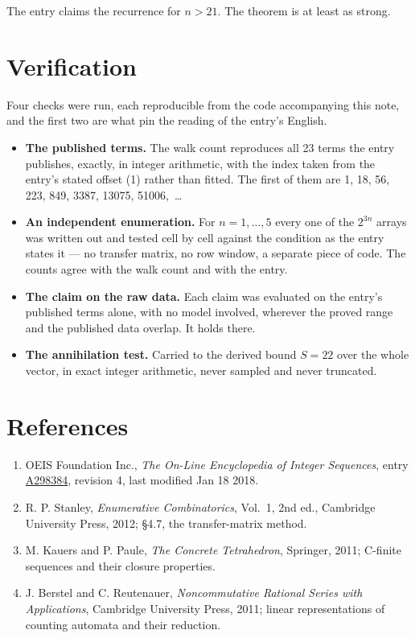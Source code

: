 \documentclass[11pt]{article}
\theoremstyle{definition}
\begin{document}
The entry claims the recurrence for $n > 21$. The theorem is at least as strong.

\section{Verification}

Four checks were run, each reproducible from the code accompanying this note, and the first two are what pin the reading of the entry's English.

\begin{itemize}

\item {\bfseries The published terms.} The walk count reproduces all 23 terms the entry publishes, exactly, in integer arithmetic, with the index taken from the entry's stated offset (1) rather than fitted. The first of them are 1, 18, 56, 223, 849, 3387, 13075, 51006,~\dots

\item {\bfseries An independent enumeration.} For $n = 1,\dots,5$ every one of the $2^{3n}$ arrays was written out and tested cell by cell against the condition as the entry states it --- no transfer matrix, no row window, a separate piece of code. The counts agree with the walk count and with the entry.

\item {\bfseries The claim on the raw data.} Each claim was evaluated on the entry's published terms alone, with no model involved, wherever the proved range and the published data overlap. It holds there.

\item {\bfseries The annihilation test.} Carried to the derived bound $S = 22$ over the whole vector, in exact integer arithmetic, never sampled and never truncated.

\end{itemize}

\section{References}

\begin{enumerate}

\item OEIS Foundation Inc., \emph{The On-Line Encyclopedia of Integer Sequences}, entry \href{https://oeis.org/A298384}{A298384}, revision 4, last modified Jan 18 2018.

\item R. P. Stanley, \emph{Enumerative Combinatorics}, Vol.~1, 2nd ed., Cambridge University Press, 2012; \S4.7, the transfer-matrix method.

\item M. Kauers and P. Paule, \emph{The Concrete Tetrahedron}, Springer, 2011; C-finite sequences and their closure properties.

\item J. Berstel and C. Reutenauer, \emph{Noncommutative Rational Series with Applications}, Cambridge University Press, 2011; linear representations of counting automata and their reduction.

\end{enumerate}
\end{document}
